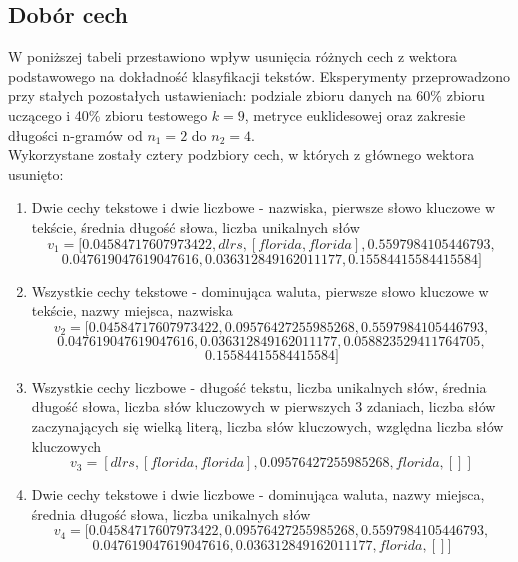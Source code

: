 \documentclass{article}
\begin{document}

\subsection{Dobór cech}
W poniższej tabeli przestawiono wpływ usunięcia różnych cech z wektora podstawowego na dokładność klasyfikacji tekstów. Eksperymenty przeprowadzono przy stałych pozostałych ustawieniach: podziale zbioru danych na 60\% zbioru uczącego i 40\% zbioru testowego \(k = 9\), metryce euklidesowej oraz zakresie długości n-gramów od \(n_1 = 2\) do \(n_2 = 4\). \\
Wykorzystane zostały cztery podzbiory cech, w których z głównego wektora usunięto:
\begin{enumerate}
    \item Dwie cechy tekstowe i dwie liczbowe - nazwiska, pierwsze słowo kluczowe w tekście, średnia długość słowa, liczba unikalnych słów
    \[
    v_1 = [ 0.04584717607973422, dlrs, [ florida, florida], 0.5597984105446793, 
    \]
    \[
         0.047619047619047616, 0.036312849162011177, 0.15584415584415584 ]
    \]
    \item Wszystkie cechy tekstowe - dominująca waluta, pierwsze słowo kluczowe w tekście, nazwy miejsca, nazwiska
    \[
    v_2 = [ 0.04584717607973422, 0.09576427255985268, 0.5597984105446793, 
    \]
    \[
          0.047619047619047616, 0.036312849162011177, 0.058823529411764705, 
    \]
    \[
        0.15584415584415584 ]
    \]
    \item Wszystkie cechy liczbowe - długość tekstu, liczba unikalnych słów, średnia długość słowa, liczba słów kluczowych w pierwszych 3 zdaniach, liczba słów zaczynających się wielką literą, liczba słów kluczowych, względna liczba słów kluczowych
    \[
    v_3 = [  dlrs, [ florida, florida], 0.09576427255985268, florida, [] ]
\]
    \item Dwie cechy tekstowe i dwie liczbowe - dominująca waluta, nazwy miejsca, średnia długość słowa, liczba unikalnych słów
    \[
    v_4 = [ 0.04584717607973422, 0.09576427255985268, 0.5597984105446793, 
\]
\[
     0.047619047619047616, 0.036312849162011177, florida, [] ]
\]
\end{enumerate}
\end{document}
